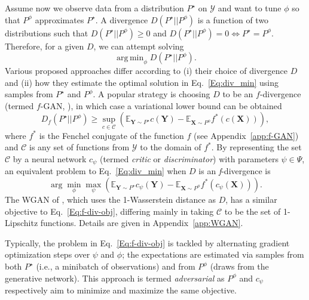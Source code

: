 \documentclass[twoside,11pt]{article}
\newcommand{\Ddsim}{\mathbf{X}}
\newcommand{\Ddobs}{\mathbf{Y}}
\DeclareMathOperator*{\argmin}{arg\,min}
\begin{document}
	Assume now we observe data from a distribution $ P^\star $ on $ \mathcal Y $ and want to tune $ \phi $ so that $ P^\phi $ approximates $P^\star $. A divergence $ D(P^\star||P^\phi) $ is a function of two distributions such that $ D(P^\star||P^\phi)\ge0 $ and $D(P^\star||P^\phi) =0\iff P^\star=P^\phi$. Therefore, for a given $ D $, we can attempt solving
	\begin{equation}\label{Eq:div_min}
	\argmin_\phi D(P^\star||P^\phi).
	\end{equation}
	Various proposed approaches differ according to (i) their choice of divergence $ D $ and (ii) how they estimate the optimal solution in Eq.~\eqref{Eq:div_min} using samples from $ P^\star $ and $ P^\phi $. 
	A popular strategy is choosing $ D $ to be an $ f $-divergence (termed $ f $-GAN, \citealp{nowozin2016f}), in which case
	a variational lower bound can be obtained
	\begin{equation}\label{Eq:f-div-bound}
	D_f(P^\star||P^\phi)	\ge \sup_{c \in \mathcal{C}} \left(\mathbb{E}_{\Ddobs \sim P^\star}c(\Ddobs)-\mathbb{E}_{\Ddsim \sim P^\phi}f^{*}(c(\Ddsim))\right),
	\end{equation}
	where $ f^* $ is the Fenchel conjugate of the function $ f $ (see Appendix~\ref{app:f-GAN}) and $ \mathcal{C} $ is any set of functions
	from $ \mathcal{Y} $ to the domain of $ f^* $. By representing the set $ \mathcal{C} $ by a neural network $ c_\psi $ (termed \textit{critic} or \textit{discriminator}) with parameters $ \psi \in \Psi $, 
	an equivalent problem to Eq.~\eqref{Eq:div_min} when $ D $ is an \textit{f}-divergence is
	\begin{equation}\label{Eq:f-div-obj}
	\arg \min_\phi \max_\psi  \left(\mathbb{E}_{\Ddobs \sim P^\star}c_\psi(\Ddobs)-\mathbb{E}_{\Ddsim \sim P^\phi}f^{*}(c_\psi(\Ddsim))\right).
	\end{equation}
	The WGAN of \citet{arjovsky2017wasserstein}, which uses the 1-Wasserstein distance as $ D $, has a similar objective to Eq.~\eqref{Eq:f-div-obj}, differing mainly in taking $ \mathcal{C} $ to be the set of 1-Lipschitz functions.
	Details are given in Appendix~\ref{app:WGAN}.
	
	Typically, the problem in Eq.~\eqref{Eq:f-div-obj} is tackled by
	alternating gradient optimization steps over $ \psi $ and $ \phi $; the expectations are estimated via samples from both $ P^\star $ (i.e., a 	minibatch of observations) and from $ P^\phi $ (draws from the generative network). This approach is termed \textit{adversarial} as $ P^\phi $ and $ c_\psi$ respectively aim to minimize and maximize the same objective. 
	
\end{document}
